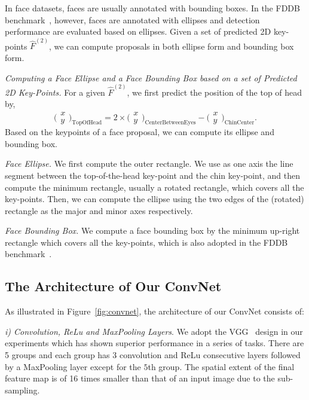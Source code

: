 \documentclass[runningheads]{llncs}
\begin{document}
In face datasets, faces are usually annotated with bounding boxes. In the FDDB benchmark~\cite{FDDB}, however, faces are annotated with ellipses and detection performance are evaluated based on ellipses.  Given a set of predicted 2D key-points $\hat{F}^{(2)}$, we can compute proposals in both ellipse form and bounding box form. 

\textit{Computing a Face Ellipse and a Face Bounding Box based on a set of Predicted 2D Key-Points.}
For a given $\hat{F}^{(2)}$,  we first predict the position of the top of head by,
\[
\bigl(\begin{smallmatrix}
x \\ y
\end{smallmatrix} \bigr)_\text{TopOfHead} = 2 \times \bigl(\begin{smallmatrix}
x \\ y
\end{smallmatrix} \bigr)_\text{CenterBetweenEyes} - \bigl(\begin{smallmatrix}
x \\ y
\end{smallmatrix} \bigr)_\text{ChinCenter}.
\]
Based on the keypoints of a face proposal, we can compute its ellipse and bounding box. 

\textit{Face Ellipse.} We first compute the outer rectangle. We use as one axis the line segment between the top-of-the-head key-point and the chin key-point, and then compute the minimum rectangle, usually a rotated rectangle, which covers all the key-points. Then, we can compute the ellipse using the two edges of the (rotated) rectangle as the major and minor axes respectively. 

\textit{Face Bounding Box.} We compute a face bounding box by the minimum up-right rectangle which covers all the key-points, which is also adopted in the FDDB benchmark~\cite{FDDB}.

\subsection{The Architecture of Our ConvNet}\label{sec:architecture}
As illustrated in Figure~\ref{fig:convnet}, the architecture of our ConvNet consists of:


 \textit{i) Convolution, ReLu and MaxPooling Layers}. We adopt the VGG~\cite{VGG} design in our experiments which has shown superior performance in a series of tasks. There are 5 groups and each group has 3 convolution and ReLu consecutive layers followed by a MaxPooling layer except for the $5$th group. The spatial extent of the final feature map is of 16 times smaller than that of an input image due to the sub-sampling.
\end{document}
